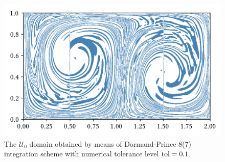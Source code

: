 \begin{figure}[htpb]
    \centering
    \includegraphics{figures/domain_figures/rkdp87_tol=0.1.png}
    \caption[The $\mathcal{U}_{0}$ domain obtained by means of
    Dormand-Prince 8(7) integration scheme with numerical tolerance level
    $\textnormal{tol}=0.1$]{
        The $\mathcal{U}_{0}$ domain obtained by means of Dormand-Prince 8(7)
    integration scheme with numerical tolerance level $\textnormal{tol}=0.1$.}
    \label{fig:u0_dp87}
\end{figure}

